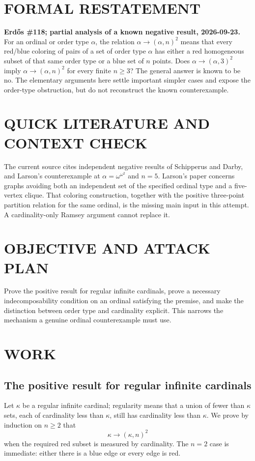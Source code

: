 \section{FORMAL RESTATEMENT}
\textbf{Erd\H{o}s \#118; partial analysis of a known negative result, 2026-09-23.}
For an ordinal or order type $\alpha$, the relation $\alpha\to(\alpha,n)^2$ means that every red/blue coloring of pairs of a set of order type $\alpha$ has either a red homogeneous subset of that same order type or a blue set of $n$ points. Does $\alpha\to(\alpha,3)^2$ imply $\alpha\to(\alpha,n)^2$ for every finite $n\geq3$? The general answer is known to be no. The elementary arguments here settle important simpler cases and expose the order-type obstruction, but do not reconstruct the known counterexample.

\section{QUICK LITERATURE AND CONTEXT CHECK}
The current source cites independent negative results of Schipperus and Darby, and Larson's counterexample at $\alpha=\omega^{\omega^2}$ and $n=5$. Larson's paper concerns graphs avoiding both an independent set of the specified ordinal type and a five-vertex clique. That coloring construction, together with the positive three-point partition relation for the same ordinal, is the missing main input in this attempt. A cardinality-only Ramsey argument cannot replace it.

\section{OBJECTIVE AND ATTACK PLAN}
Prove the positive result for regular infinite cardinals, prove a necessary indecomposability condition on an ordinal satisfying the premise, and make the distinction between order type and cardinality explicit. This narrows the mechanism a genuine ordinal counterexample must use.

\section{WORK}
\subsection{The positive result for regular infinite cardinals}
Let $\kappa$ be a regular infinite cardinal; regularity means that a union of fewer than $\kappa$ sets, each of cardinality less than $\kappa$, still has cardinality less than $\kappa$. We prove by induction on $n\geq2$ that
\[
\kappa\to(\kappa,n)^2
\tag{1}
\]
when the required red subset is measured by cardinality. The $n=2$ case is immediate: either there is a blue edge or every edge is red.

